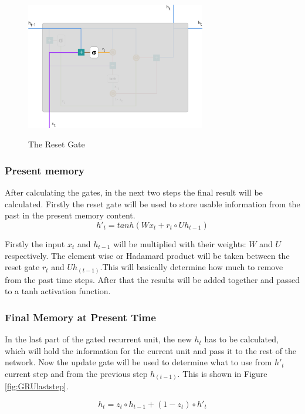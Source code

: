 \begin{figure}[htp]
	\centering
	\includegraphics[width=0.7\textwidth]{Illustrations/GRUresetgate.png}
	\caption{The Reset Gate}\cite{GRUPHOTOS}
	\label{fig:GRUresetgate}
\end{figure}

\newpage
\subsubsection{Present memory}
After calculating the gates, in the next two steps the final result will be calculated.
Firstly the reset gate will be used to store usable information from the past in the present memory content.
\begin{equation}
h'_t=tanh(Wx_t+r_t \circ Uh_{t-1})
\end{equation}

Firstly the input $x_t$ and $h_{t-1}$ will be multiplied with their weights: $W$ and $U$ respectively. The element wise or Hadamard product will be taken between the reset gate $r_t$ and $Uh_{(t-1)}$.This will basically determine how much to remove from the past time steps. After that the results will be added together and passed to a tanh activation function.
\newpage
\subsubsection{Final Memory at Present Time}
In the last part of the gated recurrent unit, the new $h_t$ has to be calculated, which will hold the information for the current unit and pass it to the rest of the network.
Now the update gate will be used to determine what to use from $h'_t$ current step and from the previous step $h_{(t-1)}$. This is shown in Figure \ref{fig:GRUlaststep}.

\begin{equation}
h_t=z_t \circ h_{t-1}+(1-z_t) \circ h'_t
\end{equation}


